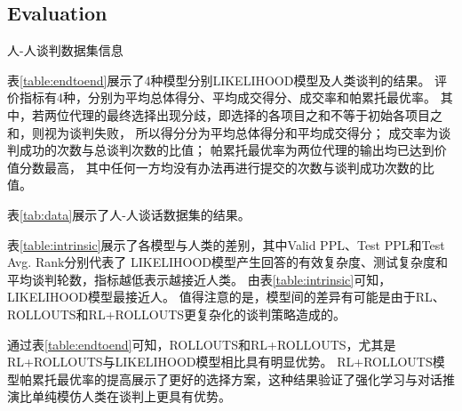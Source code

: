 \subsection{Evaluation}

\begin{table}
    \parbox[b]{0.4\textwidth}{
        \centering
        \caption{\label{tab:data} 人-人谈判数据集信息}
        }
    \parbox[b]{0.6\textwidth}{
        \centering
        \caption{\label{table:intrinsic} 词汇复杂度和平均谈判轮数排名}
        }
\end{table}

表\ref{table:endtoend}展示了4种模型分别LIKELIHOOD模型及人类谈判的结果。
评价指标有4种，分别为平均总体得分、平均成交得分、成交率和帕累托最优率。
其中，若两位代理的最终选择出现分歧，即选择的各项目之和不等于初始各项目之和，则视为谈判失败，
所以得分分为平均总体得分和平均成交得分；
成交率为谈判成功的次数与总谈判次数的比值；
帕累托最优率为两位代理的输出均已达到价值分数最高，
其中任何一方均没有办法再进行提交的次数与谈判成功次数的比值。

表\ref{tab:data}展示了人-人谈话数据集的结果。

表\ref{table:intrinsic}展示了各模型与人类的差别，其中Valid PPL、Test PPL和Test Avg. Rank分别代表了
LIKELIHOOD模型产生回答的有效复杂度、测试复杂度和平均谈判轮数，指标越低表示越接近人类。
由表\ref{table:intrinsic}可知，LIKELIHOOD模型最接近人。
值得注意的是，模型间的差异有可能是由于RL、ROLLOUTS和RL+ROLLOUTS更复杂化的谈判策略造成的。

通过表\ref{table:endtoend}可知，ROLLOUTS和RL+ROLLOUTS，尤其是RL+ROLLOUTS与LIKELIHOOD模型相比具有明显优势。
RL+ROLLOUTS模型帕累托最优率的提高展示了更好的选择方案，这种结果验证了强化学习与对话推演比单纯模仿人类在谈判上更具有优势。
